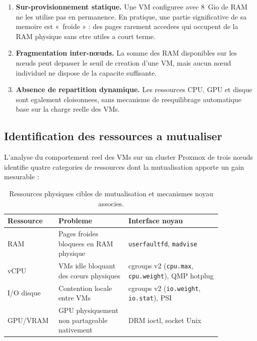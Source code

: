 \begin{enumerate}[label=(\roman*)]
    \item \textbf{Sur-provisionnement statique.} Une VM configuree avec 8~Gio de RAM ne les utilise pas en permanence. En pratique, une partie significative de sa memoire est «~froide » : des pages rarement accedees qui occupent de la RAM physique sans etre utiles a court terme.
    \item \textbf{Fragmentation inter-nœuds.} La somme des RAM disponibles sur les nœuds peut depasser le seuil de creation d'une VM, mais aucun nœud individuel ne dispose de la capacite suffisante.
    \item \textbf{Absence de repartition dynamique.} Les ressources CPU, GPU et disque sont egalement cloisonnees, sans mecanisme de reequilibrage automatique base sur la charge reelle des VMs.
\end{enumerate}

\subsection{Identification des ressources a mutualiser}
\label{subsec:ressources-mutualiser}

L'analyse du comportement reel des VMs sur un cluster Proxmox de trois nœuds identifie quatre categories de ressources dont la mutualisation apporte un gain mesurable :

\begin{table}[htbp]
    \centering
    \caption{Ressources physiques cibles de mutualisation et mecanismes noyau associes.}
    \label{tab:ressources-cibles}
    \begin{tabular}{p{0.15\linewidth} p{0.30\linewidth} p{0.40\linewidth}}
        \toprule
        \textbf{Ressource} & \textbf{Probleme} & \textbf{Interface noyau} \\
        \midrule
        RAM & Pages froides bloquees en RAM physique & \texttt{userfaultfd}, \texttt{madvise} \\
        vCPU & VMs idle bloquant des cœurs physiques & cgroups v2 (\texttt{cpu.max}, \texttt{cpu.weight}), QMP hotplug \\
        I/O disque & Contention locale entre VMs & cgroups v2 (\texttt{io.weight}, \texttt{io.stat}), PSI \\
        GPU/VRAM & GPU physiquement non partageable nativement & DRM ioctl, socket Unix \\
        \bottomrule
    \end{tabular}
\end{table}

